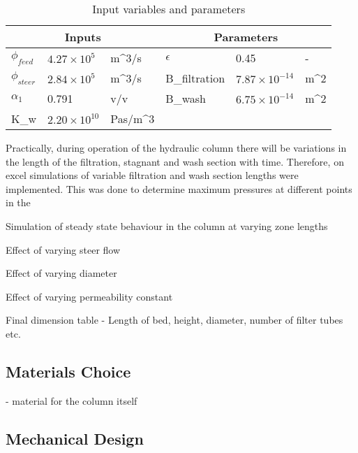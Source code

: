 \begin{table}[]
\caption{Input variables and parameters}
\label{tab:inputsparameters}
\begin{tabular}{llllll}
\hline
\multicolumn{3}{|c|}{Inputs}          & \multicolumn{3}{c|}{Parameters}             \\ \toprule
$\phi_{feed}$  & $4.27\times10^{5}$ & m^{3}/s &
$\epsilon$  & 0.45  & - \\ \hline
$\phi_{steer}$    & $2.84\times10^{5}$ & m^{3}/s &
B_{filtration}  & $7.87\times10^{-14}$ & m^{2} \\ \hline
$\alpha_1$ & 0.791  & v/v &
B_{wash}  & $6.75\times10^{-14}$ & m^{2} \\ \hline
K_{w} &  $2.20\times10^{10}$ & Pas/m^{3}  & &  &  \\ \bottomrule
\end{tabular}
\end{table}

Practically, during operation of the hydraulic column there will be variations in the length of the filtration, stagnant and wash section with time. Therefore, on excel simulations of variable filtration and wash section lengths were implemented. This was done to determine maximum pressures at different points in the

Simulation of steady state behaviour in the column at varying zone lengths

Effect of varying steer flow 

Effect of varying diameter 

Effect of varying permeability constant

Final dimension table - Length of bed, height, diameter, number of filter tubes etc. 


\subsection{Materials Choice}
- material for the column itself 

\subsection{Mechanical Design}

